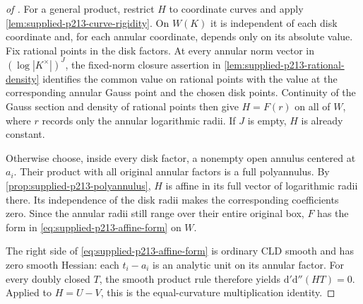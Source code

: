 \begin{proof}[of ]
For a general product, restrict $H$ to coordinate curves and apply \cref{lem:supplied-p213-curve-rigidity}. On $W(K)$ it is independent of each disk coordinate and, for each annular coordinate, depends only on its absolute value. Fix rational points in the disk factors. At every annular norm vector in $(\log|K^\times|)^J$, the fixed-norm closure assertion in \cref{lem:supplied-p213-rational-density} identifies the common value on rational points with the value at the corresponding annular Gauss point and the chosen disk points. Continuity of the Gauss section and density of rational points then give $H=F(r)$ on all of $W$, where $r$ records only the annular logarithmic radii. If $J$ is empty, $H$ is already constant.

Otherwise choose, inside every disk factor, a nonempty open annulus centered at $a_i$. Their product with all original annular factors is a full polyannulus. By \cref{prop:supplied-p213-polyannulus}, $H$ is affine in its full vector of logarithmic radii there. Its independence of the disk radii makes the corresponding coefficients zero. Since the annular radii still range over their entire original box, $F$ has the form in \eqref{eq:supplied-p213-affine-form} on $W$.

The right side of \eqref{eq:supplied-p213-affine-form} is ordinary CLD smooth and has zero smooth Hessian: each $t_i-a_i$ is an analytic unit on its annular factor. For every doubly closed $T$, the smooth product rule therefore yields $\mathrm d'\mathrm d''(HT)=0$. Applied to $H=U-V$, this is the equal-curvature multiplication identity.
\end{proof}
